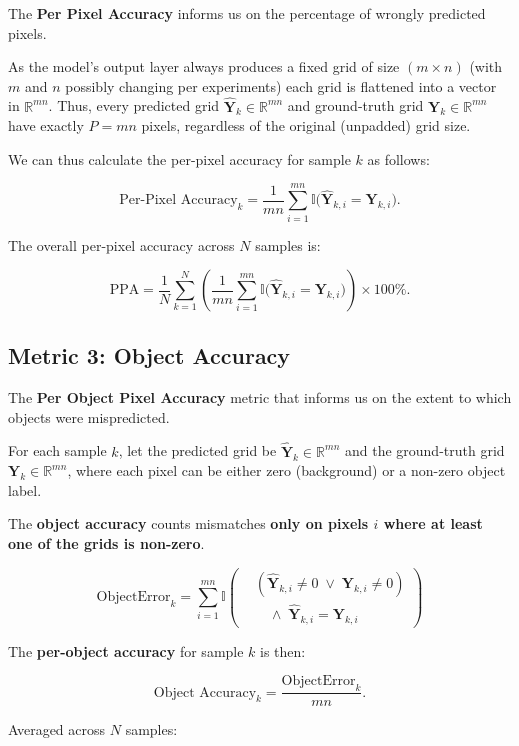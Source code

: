 The \textbf{Per Pixel Accuracy} informs us on the percentage of wrongly predicted pixels.

As the model’s output layer always produces a fixed grid of size $(m \times n)$ (with $m$ and $n$ possibly changing per experiments) each grid is flattened into a vector in $\mathbb{R}^{mn}$.  
Thus, every predicted grid $\hat{\mathbf{Y}}_k \in \mathbb{R}^{mn}$ and ground-truth grid $\mathbf{Y}_k \in \mathbb{R}^{mn}$ have exactly \(P = mn\) pixels, regardless of the original (unpadded) grid size.

We can thus calculate the per-pixel accuracy for sample $k$ as follows:

$$
\text{Per-Pixel Accuracy}_k
= \frac{1}{mn} \sum_{i=1}^{mn} 
\mathbb{I}\big( \hat{\mathbf{Y}}_{k,i} = \mathbf{Y}_{k,i} \big).
$$

The overall per-pixel accuracy across \(N\) samples is:

$$
\text{PPA}
= \frac{1}{N} \sum_{k=1}^{N} 
\left( \frac{1}{mn} \sum_{i=1}^{mn} 
\mathbb{I}\big( \hat{\mathbf{Y}}_{k,i} = \mathbf{Y}_{k,i} \big) \right)
\times 100\%.
$$
\subsection{Metric 3: Object Accuracy} 

The \textbf{Per Object Pixel Accuracy} metric that informs us on the extent to which objects were mispredicted.

For each sample $k$, let the predicted grid be  $\hat{\mathbf{Y}}_k \in \mathbb{R}^{mn}$ and the ground-truth grid $\mathbf{Y}_k \in \mathbb{R}^{mn}$, where each pixel can be either zero (background) or a non-zero object label.

The \textbf{object accuracy} counts mismatches \textbf{only on pixels $i$ where at least one of the grids is non-zero}. 

$$
\text{ObjectError}_k
= \sum_{i=1}^{mn}
\mathbb{I}\!\left(
\begin{aligned}
&(\hat{\mathbf{Y}}_{k,i} \neq 0 \;\lor\; \mathbf{Y}_{k,i} \neq 0) \\ 
&\quad\land\; \hat{\mathbf{Y}}_{k,i} = \mathbf{Y}_{k,i}
\end{aligned}
\right)
$$

The \textbf{per-object accuracy} for sample $k$ is then:

$$
\text{Object Accuracy}_k
= \frac{\text{ObjectError}_k}{mn}.
$$

Averaged across \(N\) samples:

